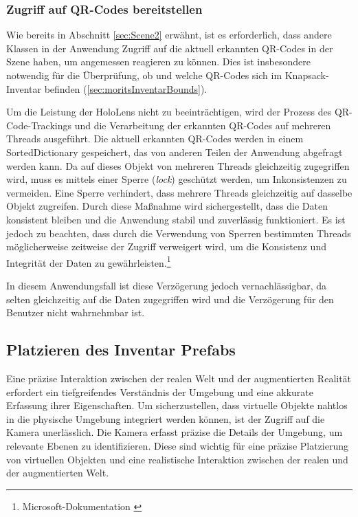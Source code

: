 \subsubsection{Zugriff auf QR-Codes bereitstellen}
Wie bereits in Abschnitt \ref{sec:Scene2} erwähnt, ist es erforderlich, dass andere Klassen in der Anwendung Zugriff auf die aktuell erkannten QR-Codes in der Szene haben, um angemessen reagieren zu können. Dies ist insbesondere notwendig für die Überprüfung, ob und welche QR-Codes sich im Knapsack-Inventar befinden (\ref{sec:moritsInventarBounds}).

Um die Leistung der HoloLens nicht zu beeinträchtigen, wird der Prozess des QR-Code-Trackings und die Verarbeitung der erkannten QR-Codes auf mehreren Threads ausgeführt. Die aktuell erkannten QR-Codes werden in einem SortedDictionary gespeichert, das von anderen Teilen der Anwendung abgefragt werden kann. Da auf dieses Objekt von mehreren Threads gleichzeitig zugegriffen wird, muss es mittels einer Sperre (\textit{lock}) geschützt werden, um Inkonsistenzen zu vermeiden. Eine Sperre verhindert, dass mehrere Threads gleichzeitig auf dasselbe Objekt zugreifen. Durch diese Maßnahme wird sichergestellt, dass die Daten konsistent bleiben und die Anwendung stabil und zuverlässig funktioniert. Es ist jedoch zu beachten, dass durch die Verwendung von Sperren bestimmten Threads möglicherweise zeitweise der Zugriff verweigert wird, um die Konsistenz und Integrität der Daten zu gewährleisten.\footnote{Microsoft-Dokumentation \cite{Lock-Statement}}

In diesem Anwendungsfall ist diese Verzögerung jedoch vernachlässigbar, da selten gleichzeitig auf die Daten zugegriffen wird und die Verzögerung für den Benutzer nicht wahrnehmbar ist.


\subsection{Platzieren des Inventar Prefabs}
Eine präzise Interaktion zwischen der realen Welt und der augmentierten Realität erfordert ein tiefgreifendes Verständnis
der Umgebung und eine akkurate Erfassung ihrer Eigenschaften. Um sicherzustellen, dass virtuelle Objekte nahtlos in die
physische Umgebung integriert werden können, ist der Zugriff auf die Kamera unerlässlich. Die Kamera erfasst präzise die
Details der Umgebung, um relevante Ebenen zu identifizieren. Diese sind wichtig für eine präzise Platzierung von virtuellen
Objekten und eine realistische Interaktion zwischen der realen und der augmentierten Welt.

